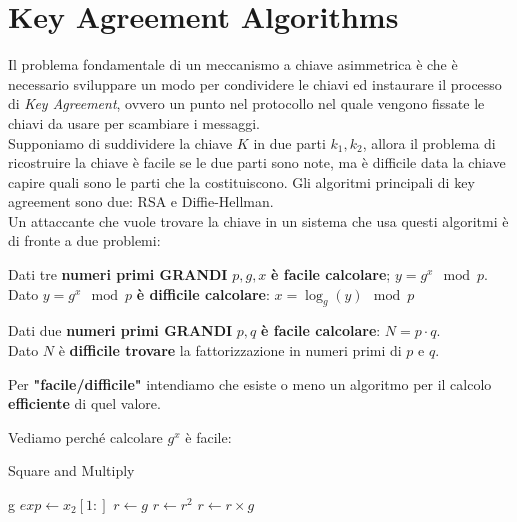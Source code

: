 \section{Key Agreement Algorithms}
Il problema fondamentale di un meccanismo a chiave asimmetrica è che è necessario sviluppare un modo per condividere le chiavi ed instaurare il processo di \textit{Key Agreement}, ovvero un punto nel protocollo nel quale vengono fissate le chiavi da usare per scambiare i messaggi.\\
Supponiamo di suddividere la chiave $K$ in due parti $k_1,k_2$, allora il problema di ricostruire la chiave è facile se le due parti sono note, ma è difficile data la chiave capire quali sono le parti che la costituiscono. Gli algoritmi principali di key agreement sono due: RSA e Diffie-Hellman.\\
Un attaccante che vuole trovare la chiave in un sistema che usa questi algoritmi è di fronte a due problemi:
\begin{proposition}\label{prop:disclog}
Dati tre \textbf{numeri primi \textsc{GRANDI}} $p,g,x$ \textbf{è facile calcolare}; $y=g^x\mod{p}$.\\
Dato $y=g^x\mod{p}$ \textbf{è difficile calcolare}: $x=\log_g(y)\mod{p}$
\end{proposition}
\begin{proposition}\label{prop:prodfact}
Dati due \textbf{numeri primi \textsc{GRANDI}} $p,q$ \textbf{è facile calcolare}: $N=p\cdot{q}$.\\
Dato $N$ è \textbf{difficile trovare} la fattorizzazione in numeri primi di $p$ e $q$.
\end{proposition}
\begin{remark}
Per \textbf{"facile/difficile"} intendiamo che esiste o meno un algoritmo per il calcolo \textbf{efficiente} di quel valore.
\end{remark}
Vediamo perché calcolare $g^x$ è facile: 
\begin{algorithm}
\caption{Square and Multiply}\label{alg:squaremult}
\begin{algorithmic}[1]
    \Return g
\Else
\State $exp\gets x_2[1:]$
\State $r\gets g$
    \State $r\gets r^2$
       \State $r\gets r\times g$
    \EndIf  
\EndFor
\EndIf
\EndProcedure
\end{algorithmic}
\end{algorithm}\\
